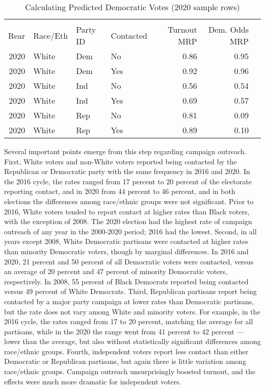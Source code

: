 \begin{table}[H]
\centering
\caption{Calculating Predicted Democratic Votes (2020 sample rows)}
\label{tab:extended-MRP}
\begin{threeparttable}
\begin{tabular}{rlllrrr}
  \hline \\ \vspace{0.5em} 
Rear & Race/Eth & Party ID& Contacted & Turnout MRP & Dem. Odds MRP  \\ 
  \hline
2020 & White & Dem & No & 0.86 & 0.95  \\ 
  2020 & White & Dem & Yes & 0.92 & 0.96  \\ 
  2020 & White & Ind & No & 0.56 & 0.54 \\ 
  2020 & White & Ind & Yes & 0.69 & 0.57  \\ 
  2020 & White & Rep & No & 0.81 & 0.09  \\ 
  2020 & White & Rep & Yes & 0.89 & 0.10  \\
   \hline
\end{tabular}
\end{threeparttable}
\end{table}

Several important points emerge from this step regarding campaign outreach. First, White voters and non-White voters reported being contacted by the Republican or Democratic party with the same frequency in 2016 and 2020. In the 2016 cycle, the rates ranged from 17 percent to 20 percent of the electorate reporting contact, and in 2020 from 44 percent to 46 percent, and in both elections the differences among race/ethnic groups were not significant. Prior to 2016, White voters tended to report contact at higher rates than Black voters, with the exception of 2008. The 2020 election had the highest rate of campaign outreach of any year in the 2000-2020 period; 2016 had the lowest. Second, in all years except 2008, White Democratic partisans were contacted at higher rates than minority Democratic voters, though by marginal differences. In 2016 and 2020, 21 percent and 50 percent of all Democratic voters were contacted, versus an average of 20 percent and 47 percent of minority Democratic voters, respectively. In 2008, 55 percent of Black Democrats reported being contacted versus 49 percent of White Democrats. Third, Republican partisans report being contacted by a major party campaign at lower rates than Democratic partisans, but the rate does not vary among White and minority voters. For example, in the 2016 cycle, the rates ranged from 17 to 20 percent, matching the average for all partisans, while in the 2020 the range went from 41 percent to 42 percent --- lower than the average, but also without statistically significant differences among race/ethnic groups. Fourth, independent voters report less contact than either Democratic or Republican partisans, but again there is little variation among race/ethnic groups. Campaign outreach unsurprisingly boosted turnout, and the effects were much more dramatic for independent voters.

